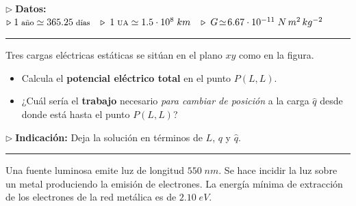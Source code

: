 \documentclass[a4paper,14pt]{exam}
\newcommand{\halmos}{
					\begin{flushright}
						\rule{1mm}{2.5mm} 
					\end{flushright}
					  }
\renewcommand{\qed}{\halmos}
\begin{document}
\begin{questions}
\begin{question}
	{
	\small \textbf{$\triangleright\;$Datos:} \hspace*{.5cm} $\triangleright\; 1\;\text{\footnotesize año}\simeq 365.25\;\text{\footnotesize días}\hspace{.3cm}
\triangleright\;1\;\text{\scriptsize UA}\simeq 1.5\cdot 10^8\;km\hspace{.3cm} \triangleright\;G\!\simeq\! 6.67\cdot 10^{-11}\;N\,m^2\,kg^{-2}$
	}	
	\end{question}
	\qed
	
	
	\begin{minipage}{.61\linewidth}
\begin{question}
 Tres cargas eléctricas estáticas se sitúan en el plano $xy$ como en la figura.  
\begin{itemize}
			\item[(a)] Calcula el \textbf{potencial eléctrico total} en el punto $P(L,L)$.
			\item[(b)] ¿Cuál sería el \textbf{trabajo} necesario \textit{para cambiar de posición} a la carga $\hat{q}$ desde donde está hasta el punto $P(L,L)$?

			
			\end{itemize}
\end{question}	
{\small \textbf{$\triangleright\;$Indicación:} Deja la solución en términos de $L$, $q$ y $\hat q$.}
		
\end{minipage}\hfill
\begin{minipage}{.4\linewidth}

	\hspace*{.5cm}\def\svgwidth{0.9\linewidth}
	
\end{minipage}
	\qed


\begin{question}
		
		Una fuente luminosa emite luz de longitud $550\;nm$. Se hace incidir la luz sobre un metal produciendo la emisión de electrones. La energía mínima de extracción de los electrones de la red metálica es de $2.10\;eV$. 


\end{question}
\end{questions}
\end{document}

